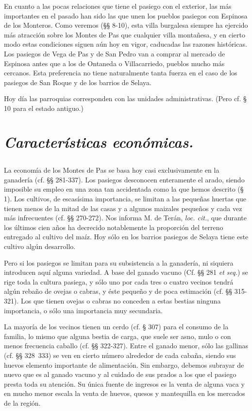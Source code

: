En cuanto a las pocas relaciones que tiene el pasiego con el exterior, las más importantes en el pasado han sido las que unen los pueblos pasiegos con Espinosa de los Monteros. Como veremos (§§ 8-10), esta villa burgalesa siempre ha ejercido más atracción sobre los Montes de Pas que cualquier villa montañesa, y en cierto modo estas condiciones siguen aún hoy en vigor, caducadas las razones históricas. Los pasiegos de Vega de Pas y de San Pedro van a comprar al mercado de Espinosa antes que a los de Ontaneda o Villacarriedo, pueblos mucho más cercanos. Esta preferencia no tiene naturalmente tanta fuerza en el caso de los pasiegos de San Roque y de los barrios de Selaya.

Hoy día las parroquias corresponden con las unidades administrativas. (Pero cf. § 10 para el estado antiguo.)

\section{\emph{Características económicas.}}

\subsection{} La economía de los Montes de Pas se basa hoy casi exclusivamente en la ganadería (cf. §§ 281-337). Los pasiegos desconocen enteramente el arado, siendo imposible su empleo en una zona tan accidentada como la que hemos descrito (§ 1). Los cultivos, de escasísima importancia, se limitan a las pequeñas huertas que tienen menos de la mitad de las casas y a algunos maizales pequeños y cada vez más infrecuentes (cf. §§ 270-272). Nos informa M. de Terán, \emph{loc. cit.}, que durante los últimos cien años ha decrecido notablemente la proporción del terreno entregado al cultivo del maíz. Hoy sólo en los barrios pasiegos de Selaya tiene este cultivo algún desarrollo.

Pero si los pasiegos se limitan para su subsistencia a la ganadería, ni siquiera introducen aquí alguna variedad. A base del ganado vacuno (Cf. §§ 281 \emph{et seq.}) se rige toda la cultura pasiega, y sólo uno por cada tres o cuatro vecinos tendrá algún rebaño de ovejas o cabras, y éste
pequeño y de poca estimación (cf. §§ 315-321). Los que tienen ovejas o cabras no conceden a estas bestias ninguna importancia, o sólo una importancia muy secundaria.

La mayoría de los vecinos tienen un cerdo (cf. § 307) para el consumo de la familia, lo mismo que alguna bestia de carga, que suele ser asno, mulo o con menos frecuencia caballo (cf. §§ 322-327). Entre el ganado menor, sólo las gallinas (cf. §§ 328~333) se ven en cierto número alrededor de cada cabaña, siendo sus huevos elemento importante de alimentación. Sin embargo, debemos subrayar de nuevo que es al  ganado vacuno y al cuidado de sus prados a los que el pasiego presta toda su atención. Su única fuente de ingresos es la venta de alguna vaca y en mucho menor escala la venta de huevos, quesos y mantequilla en los mercados de la región. 

